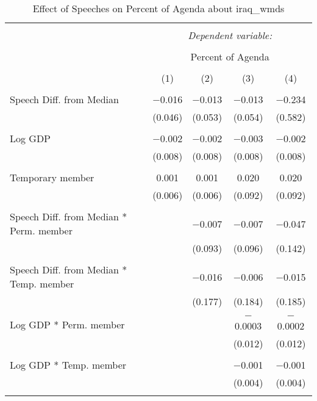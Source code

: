 
\begin{table}[!htbp] \centering 
  \caption{Effect of Speeches on Percent of Agenda about  iraq_wmds} 
  \label{} 
\begin{tabular}{@{\extracolsep{5pt}}lcccc} 
\\[-1.8ex]\hline 
\hline \\[-1.8ex] 
 & \multicolumn{4}{c}{\textit{Dependent variable:}} \\ 
\cline{2-5} 
\\[-1.8ex] & \multicolumn{4}{c}{Percent of Agenda} \\ 
\\[-1.8ex] & (1) & (2) & (3) & (4)\\ 
\hline \\[-1.8ex] 
 Speech Diff. from Median & $-$0.016 & $-$0.013 & $-$0.013 & $-$0.234 \\ 
  & (0.046) & (0.053) & (0.054) & (0.582) \\ 
  & & & & \\ 
 Log GDP & $-$0.002 & $-$0.002 & $-$0.003 & $-$0.002 \\ 
  & (0.008) & (0.008) & (0.008) & (0.008) \\ 
  & & & & \\ 
 Temporary member & 0.001 & 0.001 & 0.020 & 0.020 \\ 
  & (0.006) & (0.006) & (0.092) & (0.092) \\ 
  & & & & \\ 
 Speech Diff. from Median * Perm. member &  & $-$0.007 & $-$0.007 & $-$0.047 \\ 
  &  & (0.093) & (0.096) & (0.142) \\ 
  & & & & \\ 
 Speech Diff. from Median * Temp. member &  & $-$0.016 & $-$0.006 & $-$0.015 \\ 
  &  & (0.177) & (0.184) & (0.185) \\ 
  & & & & \\ 
 Log GDP * Perm. member &  &  & $-$0.0003 & $-$0.0002 \\ 
  &  &  & (0.012) & (0.012) \\ 
  & & & & \\ 
 Log GDP * Temp. member &  &  & $-$0.001 & $-$0.001 \\ 
  &  &  & (0.004) & (0.004) \\ 
  & & & & \\ 

\end{tabular}
\end{table}
